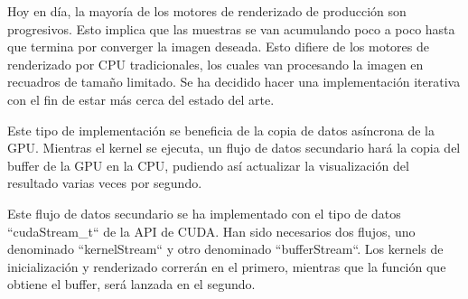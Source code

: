 	Hoy en día, la mayoría de los motores de renderizado de producción son progresivos. Esto implica que las muestras se van acumulando poco a poco hasta que termina por converger la imagen deseada. Esto difiere de los motores de renderizado por CPU tradicionales, los cuales van procesando la imagen en recuadros de tamaño limitado. Se ha decidido hacer una implementación iterativa con el fin de estar más cerca del estado del arte.



	Este tipo de implementación se beneficia de la copia de datos asíncrona de la GPU. Mientras el kernel se ejecuta, un flujo de datos secundario hará la copia del buffer de la GPU en la CPU, pudiendo así actualizar la visualización del resultado varias veces por segundo.

	Este flujo de datos secundario se ha implementado con el tipo de datos ``cudaStream\_t`` de la API de CUDA. Han sido necesarios dos flujos, uno denominado ``kernelStream`` y otro denominado ``bufferStream``. Los kernels de inicialización y renderizado correrán en el primero, mientras que la función que obtiene el buffer, será lanzada en el segundo.

